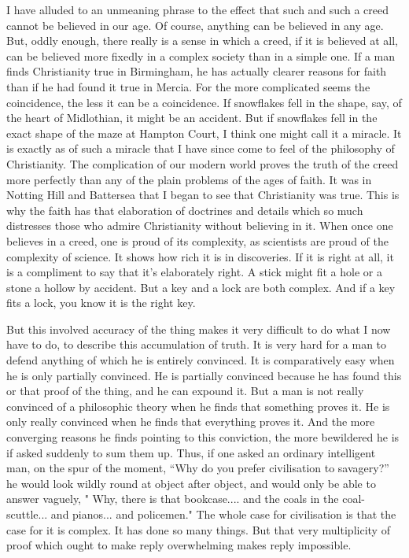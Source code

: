 \documentclass{book}
\begin{document}
I have alluded to an unmeaning phrase to the effect that such and such a creed cannot be believed in our age. Of course, anything can be believed in any age. But, oddly enough, there really is a sense in which a creed, if it is believed at all, can be believed more fixedly in a complex society than in a simple one. If a man finds Christianity true in Birmingham, he has actually clearer reasons for faith than if he had found it true in Mercia. For the more complicated seems the coincidence, the less it can be a coincidence. If snowflakes fell in the shape, say, of the heart of Midlothian, it might be an accident. But if snowflakes fell in the exact shape of the maze at Hampton Court, I think one might call it a miracle. It is exactly as of such a miracle that I have since come to feel of the philosophy of Christianity. The complication of our modern world proves the truth of the creed more perfectly than any of the plain problems of the ages of faith. It was in Notting Hill and Battersea that I began to see that Christianity was true. This is why the faith has that elaboration of doctrines and details which so much distresses those who admire Christianity without believing in it. When once one believes in a creed, one is proud of its complexity, as scientists are proud of the complexity of science. It shows how rich it is in discoveries. If it is right at all, it is a compliment to say that it’s elaborately right. A stick might fit a hole or a stone a hollow by accident. But a key and a lock are both complex. And if a key fits a lock, you know it is the right key.

But this involved accuracy of the thing makes it very difficult to do what I now have to do, to describe this accumulation of truth. It is very hard for a man to defend anything of which he is entirely convinced. It is comparatively easy when he is only partially convinced. He is partially convinced because he has found this or that proof of the thing, and he can expound it. But a man is not really convinced of a philosophic theory when he finds that something proves it. He is only really convinced when he finds that everything proves it. And the more converging reasons he finds pointing to this conviction, the more bewildered he is if asked suddenly to sum them up. Thus, if one asked an ordinary intelligent man, on the spur of the moment, “Why do you prefer civilisation to savagery?” he would look wildly round at object after object, and would only be able to answer vaguely, " Why, there is that bookcase.... and the coals in the coal-scuttle... and pianos... and policemen." The whole case for civilisation is that the case for it is complex. It has done so many things. But that very multiplicity of proof which ought to make reply overwhelming makes reply impossible.
\end{document}
